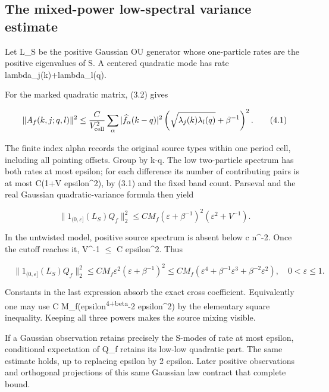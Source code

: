 \documentclass[
  11pt,
]{article}
\begin{document}
\hypertarget{the-mixed-power-low-spectral-variance-estimate}{%
\subsection{The mixed-power low-spectral variance
estimate}\label{the-mixed-power-low-spectral-variance-estimate}}

Let L\_S be the positive Gaussian OU generator whose one-particle rates
are the positive eigenvalues of S. A centered quadratic mode has rate
lambda\_j(k)+lambda\_l(q).

For the marked quadratic matrix, (3.2) gives

\[
 \|A_f(k,j;q,l)\|^2
 \le\frac C{V_{\rm cell}^2}
 \sum_\alpha|\widehat f_\alpha(k-q)|^2
 \left(\sqrt{\lambda_j(k)\lambda_l(q)}+\beta^{-1}\right)^2.
\tag{4.1}
\]

The finite index alpha records the original source types within one
period cell, including all pointing offsets. Group by k-q. The low
two-particle spectrum has both rates at most epsilon; for each
difference its number of contributing pairs is at most C(1+V
epsilon\^{}2), by (3.1) and the fixed band count. Parseval and the real
Gaussian quadratic-variance formula then yield

\[
 \|1_{(0,\varepsilon]}(L_S)Q_f\|_2^2
 \le C M_f(\varepsilon+\beta^{-1})^2
                 (\varepsilon^2+V^{-1}).
\tag{4.2}
\]

In the untwisted model, positive source spectrum is absent below c
n\^{}-2. Once the cutoff reaches it, V\^{}-1 \(\leq\) C epsilon\^{}2.
Thus

\[
 \boxed{\quad
 \|1_{(0,\varepsilon]}(L_S)Q_f\|_2^2
 \le C M_f\varepsilon^2(\varepsilon+\beta^{-1})^2
 \le C M_f\left(
 \varepsilon^4+\beta^{-1}\varepsilon^3
                  +\beta^{-2}\varepsilon^2\right),
 \quad 0<\varepsilon\le1.
 \quad}
\tag{4.3}
\]

Constants in the last expression absorb the exact cross coefficient.
Equivalently one may use C M\_f(epsilon\textsuperscript{4+beta}-2
epsilon\^{}2) by the elementary square inequality. Keeping all three
powers makes the source mixing visible.

If a Gaussian observation retains precisely the S-modes of rate at most
epsilon, conditional expectation of Q\_f retains its low-low quadratic
part. The same estimate holds, up to replacing epsilon by 2 epsilon.
Later positive observations and orthogonal projections of this same
Gaussian law contract that complete bound.
\end{document}
